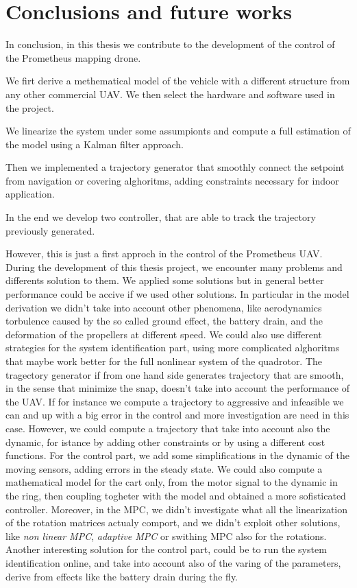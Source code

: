 \chapter{Conclusions and future works}
\label{conclusions}

In conclusion, in this thesis we contribute to the development of the control of the Prometheus mapping drone. 

\noindent We firt derive a methematical model of the vehicle with a different structure from any other commercial UAV. We then select the hardware and software used in the project. 

\noindent We linearize the system under some assumpionts and compute a full estimation of the model using a Kalman filter approach.

\noindent Then we implemented a trajectory generator that smoothly connect the setpoint from navigation or covering alghoritms, adding constraints necessary for indoor application.

\noindent In the end we develop two controller, that are able to track the trajectory previously generated.

\noindent However, this is just a first approch in the control of the Prometheus UAV. During the development of this thesis project, we encounter many problems and differents solution to them. We applied some solutions but in general better performance could be accive if we used other solutions. In particular in the model derivation we didn't take into account other phenomena, like aerodynamics torbulence caused by the so called ground effect, the battery drain, and the deformation of the propellers at different speed. We could also use different strategies for the system identification part, using more complicated alghoritms that maybe work better for the full nonlinear system of the quadrotor. The tragectory generator if from one hand side generates trajectory that are smooth, in the sense that minimize the snap, doesn't take into account the performance of the UAV. If for instance we compute a trajectory to aggressive and infeasible we can and up with a big error in the control and more investigation are need in this case. However, we could compute a trajectory that take into account also the dynamic, for istance by adding other constraints or by using a different cost functions. For the control part,  we add some simplifications in the dynamic of the moving sensors, adding errors in the steady state. We could also compute a mathematical model for the cart only, from the motor signal to the dynamic in the ring, then coupling togheter with the model and obtained a more sofisticated controller. Moreover, in the MPC, we didn't investigate what all the linearization of the rotation matrices actualy comport, and we didn't exploit other solutions, like \textit{non linear MPC}, \textit{adaptive MPC} or swithing MPC also for the rotations. Another interesting solution for the control part, could be to run the system identification online, and take into account also of the varing of the parameters, derive from effects like the battery drain during the fly.